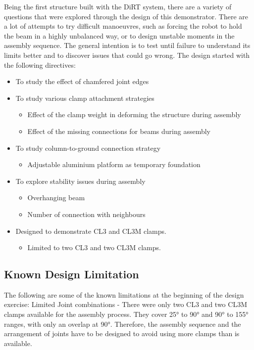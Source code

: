 Being the first structure built with the DiRT system, there are a variety of questions that were explored through the design of this demonstrator. There are a lot of attempts to try difficult manoeuvres, such as forcing the robot to hold the beam in a highly unbalanced way, or to design unstable moments in the assembly sequence. The general intention is to test until failure to understand its limits better and to discover issues that could go wrong. The design started with the following directives:
\begin{itemize}
    \item To study the effect of chamfered joint edges
    \item To study various clamp attachment strategies
    \begin{itemize}
        \item Effect of the clamp weight in deforming the structure during assembly
        \item Effect of the missing connections for beams during assembly
    \end{itemize}
    \item To study column-to-ground connection strategy
    \begin{itemize}
        \item Adjustable aluminium platform as temporary foundation
    \end{itemize}
    \item To explore stability issues during assembly
    \begin{itemize}
        \item Overhanging beam
        \item Number of connection with neighbours
    \end{itemize}
    \item Designed to demonstrate CL3 and CL3M clamps.
    \begin{itemize}
        \item Limited to two CL3 and two CL3M clamps.
    \end{itemize}
\end{itemize}

\subsection{Known Design Limitation}
\label{subsection:exploration_2_known_design_limitation}

The following are some of the known limitations at the beginning of the design exercise:
Limited Joint combinations - There were only two CL3 and two CL3M clamps available for the assembly process. They cover 25° to 90° and 90° to 155° ranges, with only an overlap at 90°. Therefore, the assembly sequence and the arrangement of joints have to be designed to avoid using more clamps than is available.

